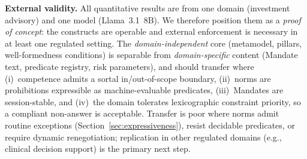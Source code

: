 \documentclass[runningheads]{llncs}
\begin{document}

\textbf{External validity.} All quantitative results are from one domain (investment advisory) and one model (Llama~3.1~8B). We therefore position them as a \emph{proof of concept}: the constructs are operable and external enforcement is necessary in at least one regulated setting. The \emph{domain-independent} core (metamodel, pillars, well-formedness conditions) is separable from \emph{domain-specific} content (Mandate text, predicate registry, risk parameters), and should transfer where (i)~competence admits a sortal in/out-of-scope boundary, (ii)~norms are prohibitions expressible as machine-evaluable predicates, (iii)~Mandates are session-stable, and (iv)~the domain tolerates lexicographic constraint priority, so a compliant non-answer is acceptable. Transfer is poor where norms admit routine exceptions (Section~\ref{sec:expressiveness}), resist decidable predicates, or require dynamic renegotiation; replication in other regulated domains (e.g., clinical decision support) is the primary next step.

\end{document}
